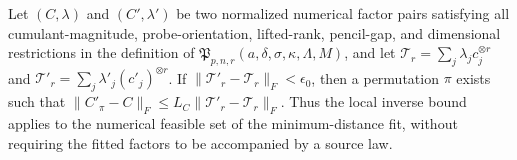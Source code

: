 Let \((C,\lambda)\) and \((C',\lambda')\) be two normalized numerical factor pairs satisfying all cumulant-magnitude, probe-orientation, lifted-rank, pencil-gap, and dimensional restrictions in the definition of \(\mathfrak P_{p,n,r}(a,\delta,\sigma,\kappa,\Lambda,M)\), and let \(\mathcal T_r=\sum_j\lambda_jc_j^{\otimes r}\) and \(\mathcal T'_r=\sum_j\lambda'_j(c'_j)^{\otimes r}\). If \(\lVert\mathcal T'_r-\mathcal T_r\rVert_F<\epsilon_0\), then a permutation \(\pi\) exists such that \(\lVert C'_{\pi}-C\rVert_F\le L_C\lVert\mathcal T'_r-\mathcal T_r\rVert_F\). Thus the local inverse bound applies to the numerical feasible set of the minimum-distance fit, without requiring the fitted factors to be accompanied by a source law.